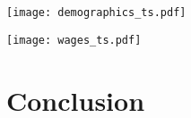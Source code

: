 \documentclass[11pt]{article}
\begin{document}
\begin{center}
  \noindent \texttt{[image: demographics\_ts.pdf]}
  \label{fig:demographics_ts}
\end{center}

\begin{center}
  \noindent \texttt{[image: wages\_ts.pdf]}
  \label{fig:earnings_ts}
\end{center}



\section{Conclusion}
\label{sec:conclusion}
\end{document}
